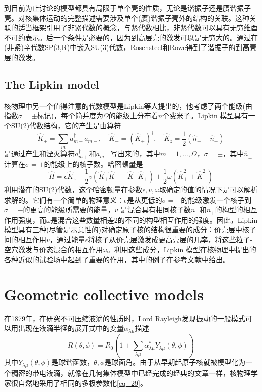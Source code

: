 到目前为止讨论的模型都具有局限于单个壳的性质，无论是谐振子还是赝谐振子壳。对核集体运动的完整描述需要涉及单个(赝)谐振子壳外的结构的关联。这种关联的适当框架引用了非紧代数的概念，与紧代数相比，非紧代数可以具有无穷维酉不可约表示。后一个条件是必要的，因为到高层壳的激发可以是无穷大的。通过在(非紧)辛代数SP(3,R)中嵌入SU(3)代数，Rosensteel和Rowe得到了谐振子的到高壳层的激发。

\subsection{The Lipkin model}

核物理中另一个值得注意的代数模型是Lipkin等人提出的，他考虑了两个能级(由指数$\sigma=\pm$标记)，每个简并度为$\Omega$的能级上分布着$n$个费米子。Lipkin 模型具有一个SU(2)代数结构，它的产生是由算符
\begin{equation*}
\hat{K}_+=\sum_ma_{m+}^\dag a_{m-},\quad\hat{K}_-=\left(\hat{K}_+\right)^\dag,\quad\hat{K}_z=\frac{1}{2}(\hat{n}_+-\hat{n}_-)
\end{equation*}
是通过产生和湮灭算符$a_{m+}^\dag$和$a_{m-}$写出来的，其中$m=1,\ldots,\Omega$，$\sigma=\pm$，其中$\hat{n}_\pm$计算在$\sigma=\pm$的能级上的核子数。哈密顿量是
\begin{equation*}
\hat{H}=\epsilon\hat{K}_z+\frac{1}{2}v\left(\hat{K}_+\hat{K}_-+\hat{K}_-\hat{K}_+\right)+\frac{1}{2}\omega\left(\hat{K}_+^2+\hat{K}_-^2\right)
\end{equation*}
利用潜在的SU(2)代数，这个哈密顿量在参数$\epsilon,v,\omega$取确定的值的情况下是可以解析求解的。它们有一个简单的物理意义：$\epsilon$是从更低的$\sigma=-$的能级激发一个核子到$\sigma=-$的更高的能级所需要的能量，$v$ 是混合具有相同核子数$n_-$和$n_+$的构型的相互作用强度，而$\omega$是混合这些数量相差2的不同的构型相互作用的强度。因此，Lipkin 模型具有三种(尽管是示意性的)对确定原子核的结构很重要的成分：价壳层中核子间的相互作用$v$，通过能量$\epsilon$将核子从价壳层激发成更高壳层的几率，将这些粒子-空穴激发与价态混合的相互作用$\omega$。利用这些成分，Lipkin 模型在核物理中提出的各种近似的试验场中起到了重要的作用，其中的例子在参考文献中给出。

\section{Geometric collective models}

在1879年，在研究不可压缩液滴的性质时，Lord Rayleigh发现振动的一般模式可以用出现在液滴半径的展开式中的变量$\alpha_{\lambda\mu}$描述
\begin{equation}\label{eq_29}
R(\theta,\phi)=R_0\left(1+\sum_{\lambda\mu}\alpha_{\lambda\mu}^\ast Y_{\lambda\mu}(\theta,\phi)\right)
\end{equation}
其中$Y_{\lambda\mu}(\theta,\phi)$是球谐函数，$\theta,\phi$是球面角。由于从早期起原子核就被模型化为一个稠密的带电液滴，就像在几何集体模型中已经完成的经典的文章一样，核物理学家很自然地采用了相同的多极参数化\ref{eq_29}。

